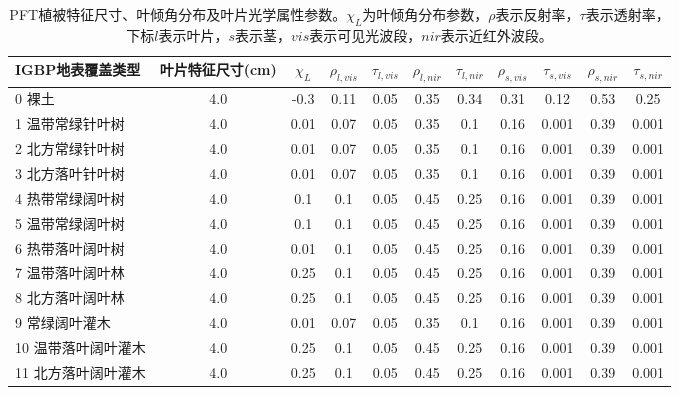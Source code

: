 \begin{landscape}
\begin{table}[htbp]    
    \centering
    \caption{PFT植被特征尺寸、叶倾角分布及叶片光学属性参数。$\chi_L$为叶倾角分布参数，$\rho$表示反射率，$\tau$表示透射率，下标$l$表示叶片，$s$表示茎，$vis$表示可见光波段，$nir$表示近红外波段。}
    \label{tab:PFT植被特征尺寸叶倾角分布及叶片光学属性参数1}
        \begin{tabular}{@{}lcccccccccc@{}}
        \toprule
        IGBP地表覆盖类型   & 叶片特征尺寸(cm) & $\chi_L$ &$\rho_{l, vis}$ & $\tau_{l, vis}$  &$\rho_{l, nir}$ &$\tau_{l, nir}$ & $\rho_{s, vis}$ &$\tau_{s, vis}$ &$\rho_{s, nir}$ &$\tau_{s,nir}$\\ \midrule
        0 裸土           & 4.0        & -0.3 & 0.11 & 0.05 & 0.35 & 0.34 & 0.31 & 0.12  & 0.53 & 0.25  \\
        1 温带常绿针叶树   & 4.0        & 0.01 & 0.07 & 0.05 & 0.35 & 0.1  & 0.16 & 0.001 & 0.39 & 0.001 \\
        2 北方常绿针叶树   & 4.0        & 0.01 & 0.07 & 0.05 & 0.35 & 0.1  & 0.16 & 0.001 & 0.39 & 0.001 \\
        3 北方落叶针叶树   & 4.0        & 0.01 & 0.07 & 0.05 & 0.35 & 0.1  & 0.16 & 0.001 & 0.39 & 0.001 \\
        4 热带常绿阔叶树   & 4.0        & 0.1  & 0.1  & 0.05 & 0.45 & 0.25 & 0.16 & 0.001 & 0.39 & 0.001 \\
        5 温带常绿阔叶树   & 4.0        & 0.1  & 0.1  & 0.05 & 0.45 & 0.25 & 0.16 & 0.001 & 0.39 & 0.001 \\
        6 热带落叶阔叶树   & 4.0        & 0.01 & 0.1  & 0.05 & 0.45 & 0.25 & 0.16 & 0.001 & 0.39 & 0.001 \\
        7 温带落叶阔叶林   & 4.0        & 0.25 & 0.1  & 0.05 & 0.45 & 0.25 & 0.16 & 0.001 & 0.39 & 0.001 \\
        8 北方落叶阔叶林   & 4.0        & 0.25 & 0.1  & 0.05 & 0.45 & 0.25 & 0.16 & 0.001 & 0.39 & 0.001 \\
        9 常绿阔叶灌木    & 4.0        & 0.01 & 0.07 & 0.05 & 0.35 & 0.1  & 0.16 & 0.001 & 0.39 & 0.001 \\
        10 温带落叶阔叶灌木 & 4.0        & 0.25 & 0.1  & 0.05 & 0.45 & 0.25 & 0.16 & 0.001 & 0.39 & 0.001 \\
        11 北方落叶阔叶灌木 & 4.0        & 0.25 & 0.1  & 0.05 & 0.45 & 0.25 & 0.16 & 0.001 & 0.39 & 0.001 \\ %

\end{tabular}
\end{table}
\end{landscape}
